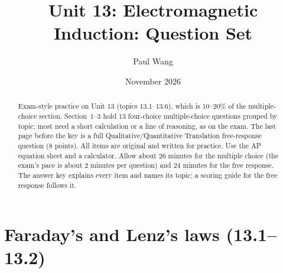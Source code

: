 \documentclass[11pt]{article}
\title{Unit 13: Electromagnetic Induction: Question Set}
\author{Paul Wang}
\date{November 2026}
\begin{document}
\maketitle

\begin{abstract}
Exam-style practice on Unit 13 (topics 13.1--13.6), which is 10--20\% of the multiple-choice section. Section~1--3 hold 13 four-choice multiple-choice questions grouped by topic; most need a short calculation or a line of reasoning, as on the exam. The last page before the key is a full Qualitative/Quantitative Translation free-response question (8 points). All items are original and written for practice. Use the AP equation sheet and a calculator. Allow about 26 minutes for the multiple choice (the exam's pace is about 2 minutes per question) and 24 minutes for the free response. The answer key explains every item and names its topic; a scoring guide for the free response follows it.
\end{abstract}


\section{Faraday's and Lenz's laws (13.1--13.2)}
\end{document}
